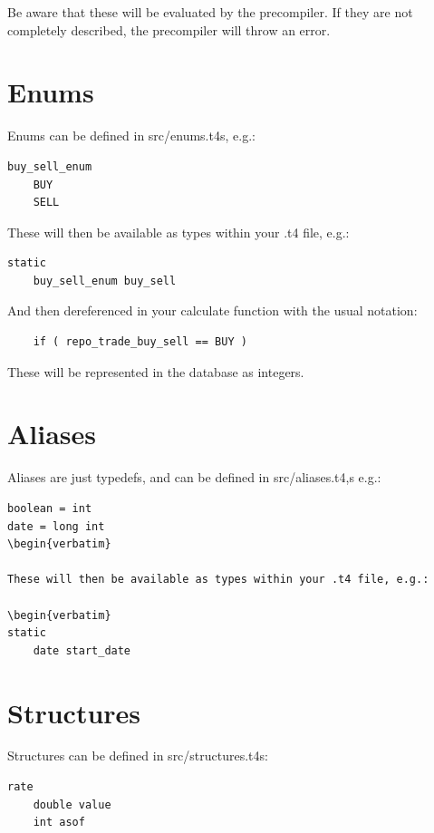 \documentclass{report}
\begin{document}
Be aware that these will be evaluated by the precompiler. If they are not completely described, the precompiler will throw an error.

\section{Enums}


Enums can be defined in src/enums.t4s, e.g.:
\begin{verbatim}
buy_sell_enum
    BUY
    SELL
\end{verbatim}

These will then be available as types within your .t4 file, e.g.:

\begin{verbatim}
static
    buy_sell_enum buy_sell
\end{verbatim}


And then dereferenced in your calculate function with the usual notation:
\begin{verbatim}
    if ( repo_trade_buy_sell == BUY ) 
\end{verbatim}

These will be represented in the database as integers.

\section{Aliases}

Aliases are just typedefs, and can be defined in src/aliases.t4,s e.g.:

\begin{verbatim}
boolean = int
date = long int
\begin{verbatim}

These will then be available as types within your .t4 file, e.g.:

\begin{verbatim}
static
    date start_date
\end{verbatim}




\section{Structures}

Structures can be defined in src/structures.t4s:

\begin{verbatim}
rate
    double value
    int asof
\end{verbatim}
\end{document}
